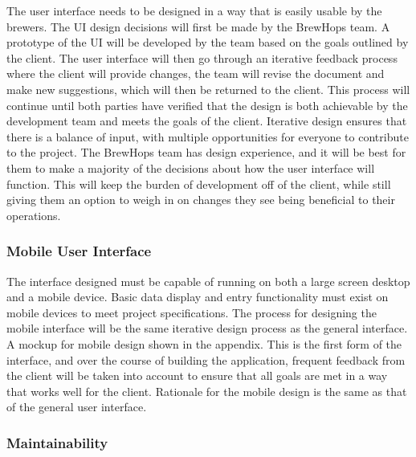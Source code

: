 \documentclass[draftclsnofoot,onecolumn,letterpaper,10pt]{IEEEtran}
\begin{document}
		The user interface needs to be designed in a way that is easily usable by the brewers.
		The UI design decisions will first be made by the BrewHops team.
		A prototype of the UI will be developed by the team based on the goals outlined by the client.
		The user interface will then go through an iterative feedback process where the client will provide changes, the team will revise the document and make new suggestions, which will then be returned to the client.
		This process will continue until both parties have verified that the design is both achievable by the development team and meets the goals of the client.
		Iterative design ensures that there is a balance of input, with multiple opportunities for everyone to contribute to the project.
		The BrewHops team has design experience, and it will be best for them to make a majority of the decisions about how the user interface will function.
		This will keep the burden of development off of the client, while still giving them an option to weigh in on changes they see being beneficial to their operations.

		\subsubsection{Mobile User Interface}

		The interface designed must be capable of running on both a large screen desktop and a mobile device.
		Basic data display and entry functionality must exist on mobile devices to meet project specifications.
		The process for designing the mobile interface will be the same iterative design process as the general interface.
		A mockup for mobile design shown in the appendix.
		This is the first form of the interface, and over the course of building the application, frequent feedback from the client will be taken into account to ensure that all goals are met in a way that works well for the client.
		Rationale for the mobile design is the same as that of the general user interface.

		\subsubsection{Maintainability}
\end{document}
